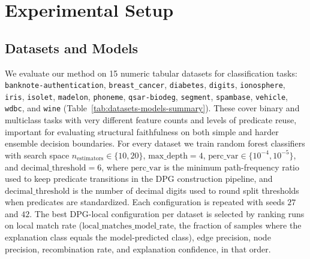 \documentclass[runningheads]{llncs}
\begin{document}
\section{Experimental Setup}

\subsection{Datasets and Models}
We evaluate our method on 15 numeric tabular  datasets for classification tasks: \texttt{banknote-authentication}, \texttt{breast\_cancer}, \texttt{diabetes}, \texttt{digits}, \texttt{ionosphere}, \texttt{iris}, \texttt{isolet}, \texttt{madelon}, \texttt{phoneme}, \texttt{qsar-biodeg}, \texttt{segment}, \texttt{spambase}, \texttt{vehicle}, \texttt{wdbc}, and \texttt{wine} (Table~\ref{tab:datasets-models-summary}). These cover binary and multiclass tasks with very different feature counts and levels of predicate reuse, important for evaluating structural faithfulness on both simple and harder ensemble decision boundaries.
For every dataset we train random forest classifiers with search space $n_{\mathrm{estimators}} \in \{10,20\}$, $\mathrm{max\_depth}=4$, $\mathrm{perc\_var} \in \{10^{-4},10^{-5}\}$, and $\mathrm{decimal\_threshold}=6$, where $\mathrm{perc\_var}$ is the minimum path-frequency ratio used to keep predicate transitions in the DPG construction pipeline, and $\mathrm{decimal\_threshold}$ is the number of decimal digits used to round split thresholds when predicates are standardized. Each configuration is repeated with seeds $27$ and $42$. The best DPG-local configuration per dataset is selected by ranking runs on local match rate ($\mathrm{local\_matches\_model\_rate}$, the fraction of samples where the explanation class equals the model-predicted class), edge precision, node precision, recombination rate, and explanation confidence, in that order.
\end{document}
